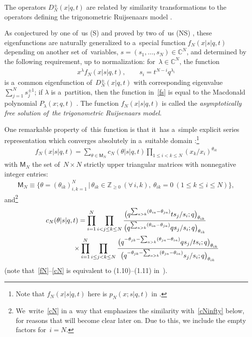 \documentclass[pdftex]{sigma}%
\numberwithin{equation}{section}
\newcommand{\C}{{\mathbb C}}
\newcommand{\Z}{{\mathbb Z}}
\begin{document}
The operators $D^\pm_N(x|q,t)$ are related by similarity transformations to the operators defining the trigonometric Ruijsenaars model \cite{R87}.

As conjectured by one of~us (S) \cite{S05} and proved by two of~us (NS) \cite{NS}, these eigenfunctions are naturally generalized to a~special function $f_N(x|s|q,t)$ depending on another set of~variables, $s=(s_1,\dots,s_N)\in\C^N$, and determined by the following requirement, up to normalization:
for~$\lambda\in\C^N$, the function
\begin{gather}
\label{fs}
x^{\lambda} f_N(x|s|q,t),\qquad s_i=t^{N-i}q^{\lambda_i}
\end{gather}
is a~common eigenfunction of~$D^\pm_N(x|q,t)$ with corresponding eigenvalue $\sum_{j=1}^N s_j^{\pm 1}$; if $\lambda$ is a~partition, then the function in~\eqref{fs} is equal to the Macdonald polynomial $P_\lambda(x;q,t)$ \cite{NS}.
The function $f_N(x|s|q,t)$ is called the {\em asymptotically free solution of~the trigonometric Ruijsenaars model}.

One remarkable property of~this function is that it~has a~simple explicit series representation which converges absolutely in a~suitable domain \cite{NS}:\footnote{Note that $f_N(x|s|q,t)$ here is $p_N(x;s|q,t)$ in \cite{NS}.}
\begin{gather}
\label{fN}
f_N(x|s|q,t)= \sum_{\theta\in\mathsf{M}_N} c_{N}(\theta|s|q,t) \prod_{1\leq i<k\leq N}(x_k/x_i)^{\theta_{ik}}
\end{gather}
with $\mathsf{M}_N$ the set of~$N\times N$ strictly upper triangular matrices with nonnegative integer entries:
\begin{gather}
\label{MMN}
\mathsf{M}_N\equiv \big\{ \theta=(\theta_{ik})_{i,k=1}^N\,|\, \theta_{ik}\in\Z_{\geq 0}\ (\forall\, i,k), \ \theta_{ik}=0\ (1\leq k\leq i\leq N)\big\} ,
\end{gather}
and\footnote{We~write~\eqref{cN} in a~way that emphasizes the similarity with~\eqref{cNinfty} below, for reasons that will become clear later on. Due to this, we include the empty factors for~$i=N$.}
\begin{gather}
c_{N}(\theta|s|q,t) =
\prod_{i=1}^N \prod_{i< j\leq k\leq N}
\frac{\big(q^{\sum_{a> k}(\theta_{ia} - \theta_{ja})}ts_{j}/s_i;q\big)_{\theta_{ik}}}
{\big(q^{\sum_{a> k}(\theta_{ia} - \theta_{ja})}qs_{j}/s_i;q\big)_{\theta_{ik}}}\nonumber
\\ \hphantom{c_{N}(\theta|s|q,t) =}
{}\times
\prod_{i=1}^N \prod_{i\leq j<k\leq N}
\frac{\big(q^{-\theta_{jk}-\sum_{a>k}(\theta_{ja}-\theta_{ia})}qs_{j}/ts_i ;q\big)_{\theta_{ik}}}{\big(q^{-\theta_{jk}-\sum_{a>k}(\theta_{ja}-\theta_{ia})}s_{j}/s_i ;q\big)_{\theta_{ik}}}
\label{cN}
\end{gather}
(note that~\eqref{fN}--\eqref{cN} is equivalent to (1.10)--(1.11) in~\cite{NS}).
\end{document}
